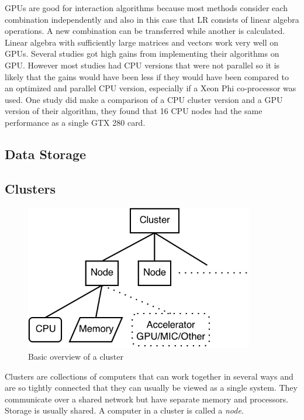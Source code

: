 \documentclass[10pt,a4paper]{report}
\begin{document}
GPUs are good for interaction algorithms because most methods consider each combination independently and also in this case that LR consists of linear algebra operations. A new combination can be transferred while another is calculated. Linear algebra with sufficiently large matrices and vectors work very well on GPUs\cite{cublas, cuda}. Several studies got high gains from implementing their algorithms on GPU\cite{gwis,gboost,gmdr_gpu,cuda_lr,genie_2012,plink_gpu}. However most studies had CPU versions that were not parallel so it is likely that the gains would have been less if they would have been compared to an optimized and parallel CPU version, especially if a Xeon Phi co-processor was used. One study did make a comparison of a CPU cluster version and a GPU version of their algorithm, they found that 16 CPU nodes had the same performance as a single GTX 280 card\cite{jiang_accelerating}.

\subsection{Data Storage}

\subsection{Clusters}
\label{clusers}

\begin{figure}[h]
    \centering
    \includegraphics[width=10cm]{Cluster.png}
    \caption{Basic overview of a cluster}
    \label{fig:cluster}
\end{figure}

Clusters are collections of computers that can work together in several ways and are so tightly connected that they can usually be viewed as a single system. They communicate over a shared network but have separate memory and processors. Storage is usually shared. A computer in a cluster is called a \emph{node}. \cite{intro_hpc, introduction_hpc_hager}
\end{document}
